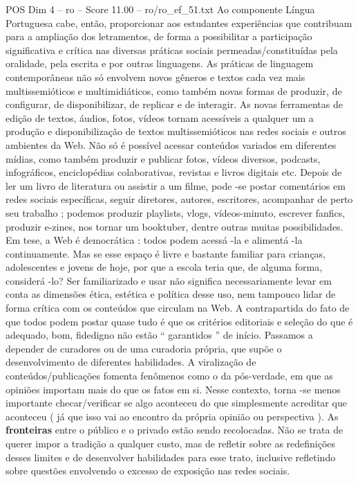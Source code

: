 \begin{textsample}{POS Dim 4 – ro – Score 11.00 – ro/ro\_ef\_51.txt}
Ao componente Língua Portuguesa cabe, então, proporcionar aos estudantes experiências que contribuam para a ampliação dos letramentos, de forma a possibilitar a participação significativa e crítica nas diversas práticas sociais permeadas/constituídas pela oralidade, pela escrita e por outras linguagens.
As práticas de linguagem contemporâneas não só envolvem novos gêneros e textos cada vez mais multissemióticos e multimidiáticos, como também novas formas de produzir, de configurar, de disponibilizar, de replicar e de interagir.
As novas ferramentas de edição de textos, áudios, fotos, vídeos tornam acessíveis a qualquer um a produção e disponibilização de textos multissemióticos nas redes sociais e outros ambientes da Web.
Não só é possível acessar conteúdos variados em diferentes mídias, como também produzir e publicar fotos, vídeos diversos, podcasts, infográficos, enciclopédias colaborativas, revistas e livros digitais etc.
Depois de ler um livro de literatura ou assistir a um filme, pode -se postar comentários em redes sociais específicas, seguir diretores, autores, escritores, acompanhar de perto seu trabalho ; podemos produzir playlists, vlogs, vídeos-minuto, escrever fanfics, produzir e-zines, nos tornar um booktuber, dentre outras muitas possibilidades.
Em tese, a Web é democrática : todos podem acessá -la e alimentá -la continuamente.
Mas se esse espaço é livre e bastante familiar para crianças, adolescentes e jovens de hoje, por que a escola teria que, de alguma forma, considerá -lo?
Ser familiarizado e usar não significa necessariamente levar em conta as dimensões ética, estética e política desse uso, nem tampouco lidar de forma crítica com os conteúdos que circulam na Web.
A contrapartida do fato de que todos podem postar quase tudo é que os critérios editoriais e seleção do que é adequado, bom, fidedigno não estão “ garantidos ” de início.
Passamos a depender de curadores ou de uma curadoria própria, que supõe o desenvolvimento de diferentes habilidades.
A viralização de conteúdos/publicações fomenta fenômenos como o da pós-verdade, em que as opiniões importam mais do que os fatos em si.
Nesse contexto, torna -se menos importante checar/verificar se algo aconteceu do que simplesmente acreditar que aconteceu ( já que isso vai ao encontro da própria opinião ou perspectiva ).
As \textbf{fronteiras} entre o público e o privado estão sendo recolocadas.
Não se trata de querer impor a tradição a qualquer custo, mas de refletir sobre as redefinições desses limites e de desenvolver habilidades para esse trato, inclusive refletindo sobre questões envolvendo o excesso de exposição nas redes sociais.

\end{textsample}
